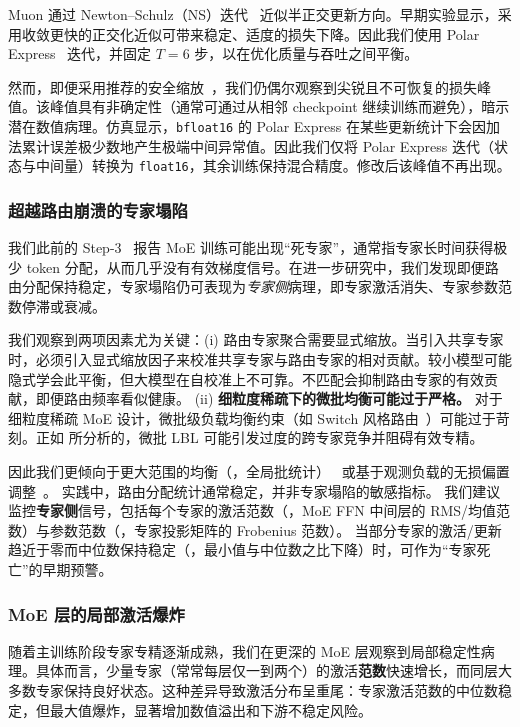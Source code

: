 Muon 通过 Newton--Schulz（NS）迭代~\cite{bernstein2024oldoptimizernewnorm} 近似半正交更新方向。早期实验显示，采用收敛更快的正交化近似可带来稳定、适度的损失下降。因此我们使用 {Polar Express}~\cite{amsel2025polarexpress} 迭代，并固定 $T{=}6$ 步，以在优化质量与吞吐之间平衡。

然而，即便采用推荐的安全缩放~\cite{amsel2025polarexpress}，我们仍偶尔观察到尖锐且不可恢复的损失峰值。该峰值具有非确定性（通常可通过从相邻 checkpoint 继续训练而避免），暗示潜在数值病理。仿真显示，\texttt{bfloat16} 的 Polar Express 在某些更新统计下会因加法累计误差极少数地产生极端中间异常值。因此我们仅将 Polar Express 迭代（状态与中间量）转换为 \texttt{float16}，其余训练保持混合精度。修改后该峰值不再出现。


\subsubsection{超越路由崩溃的专家塌陷}

我们此前的 Step-3~\cite{step3blog} 报告 MoE 训练可能出现“死专家”，通常指专家长时间获得极少 token 分配，从而几乎没有有效梯度信号。在进一步研究中，我们发现即便路由分配保持稳定，专家塌陷仍可表现为\emph{专家侧}病理，即专家激活消失、专家参数范数停滞或衰减。

我们观察到两项因素尤为关键：(i) 路由专家聚合需要显式缩放。当引入共享专家时，必须引入显式缩放因子来校准共享专家与路由专家的相对贡献。较小模型可能隐式学会此平衡，但大模型在自校准上不可靠。不匹配会抑制路由专家的有效贡献，即便路由频率看似健康。
(ii) \textbf{细粒度稀疏下的微批均衡可能过于严格。} 对于细粒度稀疏 MoE 设计，微批级负载均衡约束（如 Switch 风格路由~\cite{fedus2021switchtransformers}）可能过于苛刻。正如 \cite{qiu2025demonsdetail} 所分析的，微批 LBL 可能引发过度的跨专家竞争并阻碍有效专精。


因此我们更倾向于更大范围的均衡（\eg，全局批统计）~\cite{qiu2025demonsdetail,yang2025qwen3} 或基于观测负载的无损偏置调整~\cite{wang2024lossfreebalancing,deepseek2024deepseekv3}。
实践中，路由分配统计通常稳定，并非专家塌陷的敏感指标。
我们建议监控\textbf{专家侧}信号，包括每个专家的激活范数（\eg，MoE FFN 中间层的 RMS/均值范数）与参数范数（\eg，专家投影矩阵的 Frobenius 范数）。
当部分专家的激活/更新趋近于零而中位数保持稳定（\eg，最小值与中位数之比下降）时，可作为“专家死亡”的早期预警。




\subsubsection{MoE 层的局部激活爆炸}\label{sec:clip}
随着主训练阶段专家专精逐渐成熟，我们在更深的 MoE 层观察到局部稳定性病理。具体而言，少量专家（常常每层仅一到两个）的激活\textbf{范数}快速增长，而同层大多数专家保持良好状态。这种差异导致激活分布呈重尾：专家激活范数的中位数稳定，但最大值爆炸，显著增加数值溢出和下游不稳定风险。


